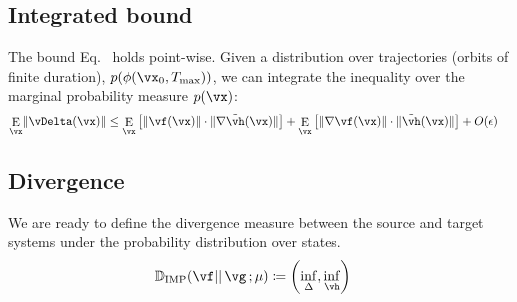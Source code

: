 \documentclass[a4paper,twoside]{article}
\renewcommand{\eqref}{Eq.~\originaleqref}
\newcounter{ct}
\newcommand{\divv}{\ensuremath{\mathbb{D}}}
\newcommand{\IMPdivv}[3]{\divv_{\text{IMP}}\!\left({#1}\middle\lvert\middle\rvert\,{#2}\,;{#3}\right)}
\DeclarePairedDelimiter{\norm}{\lVert}{\rVert}
\DeclareMathOperator*{\E}{\rm E} %
\newcommand{\homeo}{\vh}
\begin{document}
\subsection{Integrated bound}
The bound \eqref{eq:h:bound} holds point-wise.
Given a distribution over trajectories (orbits of finite duration),
$p(\phi(\vx_0,T_\text{max}))$, we can integrate the inequality over the marginal probability measure $p(\vx)$:
\begin{align}\label{eq:h:bound:integrated}
    \E_\vx \norm{\vDelta(\vx)}
    &\leq
	\E_\vx
	\left[
	    \norm{\vf(\vx)}
	    \cdot
	    \norm{\nabla\tilde\homeo(\vx)}
	\right]
	+
	\E_\vx
	\left[
	    \norm{\nabla\vf(\vx)}
	    \cdot
	    \norm{\tilde\homeo(\vx)}
	\right]
	+ O(\epsilon)
\end{align}

\subsection{Divergence}
We are ready to define the divergence measure between the source and target systems under the probability distribution over states.
\begin{align}\label{eq:divergence}
    \IMPdivv{\vf}{\vg}{\mu}
	&\coloneqq
	\left(
	\inf_\Delta
	,
	\inf_\homeo
	\right)
\end{align}



\end{document}

